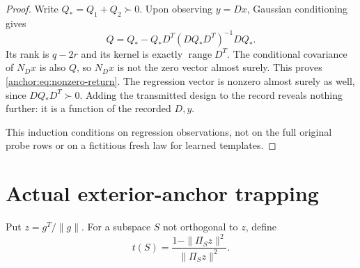 \documentclass[11pt,oneside,openany,a4paper]{book}
\numberwithin{equation}{chapter}
\theoremstyle{definition}
\theoremstyle{remark}
\DeclareMathOperator{\ran}{range}\DeclareMathOperator{\OPT}{OPT}
\begin{document}
\begin{proof}
Write $Q_*=Q_1+Q_2\succ0$. Upon observing $y=Dx$, Gaussian conditioning gives
\begin{equation}\label{anchor:eq:conditionalQ}
 Q=Q_*-Q_*D^T(DQ_*D^T)^{-1}DQ_*.
\end{equation}
Its rank is $q-2r$ and its kernel is exactly $\ran D^T$. The conditional covariance of $N_Dx$ is also $Q$, so $N_Dx$ is not the zero vector almost surely. This proves \eqref{anchor:eq:nonzero-return}. The regression vector is nonzero almost surely as well, since $DQ_*D^T\succ0$. Adding the transmitted design to the record reveals nothing further: it is a function of the recorded $D,y$.

This induction conditions on regression observations, not on the full original probe rows or on a fictitious fresh law for learned templates.
\end{proof}

\section{Actual exterior-anchor trapping}
Put $z=g^T/\|g\|$. For a subspace $S$ not orthogonal to $z$, define
\begin{equation}\label{anchor:eq:t}
 t(S)=\frac{1-\|\Pi_Sz\|^2}{\|\Pi_Sz\|^2}.
\end{equation}
\end{document}
